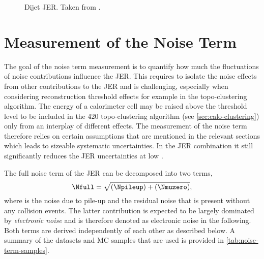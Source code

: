 \FloatBarrier
\begin{figure}
    \caption{Dijet JER. Taken from .}
    \label{fig:insitu-jer-dijet-only}
\end{figure}


\section{Measurement of the Noise Term}
\label{sec:noise-term-meas}

The goal of the noise term measurement is to quantify how much the fluctuations of noise contributions influence the JER. 
This requires to isolate the noise effects from other contributions to the JER and is challenging, especially when considering reconstruction threshold effects for example in the topo-clustering algorithm. 
The energy of a calorimeter cell may be raised above the threshold level to be included in the 420 topo-clustering algorithm (see \cref{sec:calo-clustering}) only from an interplay of different effects. The measurement of the noise term therefore relies on certain assumptions that are mentioned in the relevant sections which leads to sizeable systematic uncertainties. In the JER combination it still significantly reduces the JER uncertainties at low \pT.

The full noise term of the JER can be decomposed into two terms, 
\begin{equation}
    \Nfull = \sqrt{ \left(\Npileup \right) +  \left( \Nmuzero \right) },
\end{equation}
where \Npileup is the noise due to pile-up and \Nmuzero the residual noise that is present without any collision events.
The latter contribution is expected to be largely dominated by \emph{electronic noise} and is therefore denoted as electronic noise in the following. Both terms are derived independently of each other as described below.
A summary of the datasets and MC samples that are used is provided in \cref{tab:noise-term-samples}.


